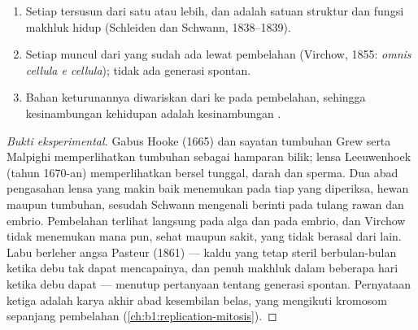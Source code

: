 \begin{proposition}\label{prop:b1:cell-unit-of-life:theory}
\begin{enumerate}
  \item Setiap  tersusun dari satu  atau lebih, dan 
        adalah satuan struktur dan fungsi makhluk hidup (Schleiden dan
        Schwann, 1838--1839).
  \item Setiap  muncul dari  yang sudah ada lewat pembelahan
        (Virchow, 1855: \emph{omnis cellula e cellula}); tidak ada
        generasi spontan.
  \item Bahan keturunannya diwariskan dari  ke  pada pembelahan,
        sehingga kesinambungan kehidupan adalah kesinambungan .
\end{enumerate}
\end{proposition}
\begin{proof}[Bukti eksperimental]
Gabus Hooke (1665) dan sayatan tumbuhan Grew serta Malpighi
memperlihatkan  tumbuhan sebagai hamparan bilik; lensa
Leeuwenhoek (tahun 1670-an) memperlihatkan  bersel tunggal, 
darah dan sperma. Dua abad pengasahan lensa yang makin baik menemukan
 pada tiap  yang diperiksa, hewan maupun tumbuhan, sesudah
Schwann mengenali  berinti pada tulang rawan dan embrio. Pembelahan
terlihat langsung pada alga dan pada embrio, dan Virchow tidak menemukan
 mana pun, sehat maupun sakit, yang  tidak berasal dari
 lain. Labu berleher angsa Pasteur (1861) --- kaldu yang tetap steril
berbulan-bulan ketika debu tak dapat mencapainya, dan penuh makhluk
dalam beberapa hari ketika debu dapat --- menutup pertanyaan tentang
generasi spontan. Pernyataan ketiga adalah karya akhir abad kesembilan
belas, yang mengikuti kromosom sepanjang pembelahan
(\cref{ch:b1:replication-mitosis}).
\end{proof}

